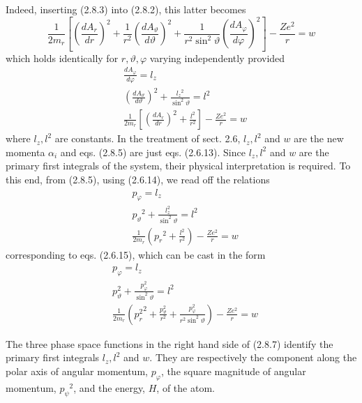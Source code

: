 \documentclass{article}
\begin{document}
Indeed, inserting (2.8.3) into (2.8.2), this latter becomes
$$
\begin{equation*}
\frac{1}{2 m_{r}}\left[\left(\frac{d A_{r}}{d r}\right)^{2}+\frac{1}{r^{2}}\left(\frac{d A_{\vartheta}}{d \vartheta}\right)^{2}+\frac{1}{r^{2} \sin ^{2} \vartheta}\left(\frac{d A_{\varphi}}{d \varphi}\right)^{2}\right]-\frac{Z e^{2}}{r}=w \tag{2.8.4}
\end{equation*}
$$
which holds identically for $r, \vartheta, \varphi$ varying independently provided
$$
\begin{align*}
& \frac{d A_{\varphi}}{d \varphi}=l_{z}  \tag{2.8.5a}\\
& \left(\frac{d A_{\vartheta}}{d \vartheta}\right)^{2}+\frac{l_{z}{ }^{2}}{\sin ^{2} \vartheta}=l^{2}  \tag{2.8.5~b}\\
& \frac{1}{2 m_{r}}\left[\left(\frac{d A_{r}}{d r}\right)^{2}+\frac{l^{2}}{r^{2}}\right]-\frac{Z e^{2}}{r}=w \tag{2.8.5c}
\end{align*}
$$
where $l_{z}, l^{2}$ are constants. In the treatment of sect. 2.6, $l_{z}, l^{2}$ and $w$ are the new momenta $\alpha_{i}$ and eqs. (2.8.5) are just eqs. (2.6.13). Since $l_{z}, l^{2}$ and $w$ are the primary first integrals of the system, their physical interpretation is required. To this end, from (2.8.5), using (2.6.14), we read off the relations
$$
\begin{align*}
& p_{\varphi}=l_{z}  \tag{2.8.6a}\\
& p_{\vartheta}{ }^{2}+\frac{l_{z}^{2}}{\sin ^{2} \vartheta}=l^{2}  \tag{2.8.6b}\\
& \frac{1}{2 m_{r}}\left(p_{r}{ }^{2}+\frac{l^{2}}{r^{2}}\right)-\frac{Z e^{2}}{r}=w \tag{2.8.6c}
\end{align*}
$$
corresponding to eqs. (2.6.15), which can be cast in the form
$$
\begin{align*}
& p_{\varphi}=l_{z}  \tag{2.8.7a}\\
& p_{\vartheta}^{2}+\frac{p_{\varphi}^{2}}{\sin ^{2} \vartheta}=l^{2}  \tag{2.8.7b}\\
& \frac{1}{2 m_{r}}\left({p_{r}^{2}}^{2}+\frac{p_{\vartheta}^{2}}{r^{2}}+\frac{p_{\varphi}^{2}}{r^{2} \sin ^{2} \vartheta}\right)-\frac{Z e^{2}}{r}=w \tag{2.8.7c}
\end{align*}
$$

The three phase space functions in the right hand side of (2.8.7) identify the primary first integrals $l_{z}, l^{2}$ and $w$. They are respectively the component along the polar axis of angular momentum, $p_{\varphi}$, the square magnitude of angular momentum, $p_{\psi}{ }^{2}$, and the energy, $H$, of the atom.
\end{document}
